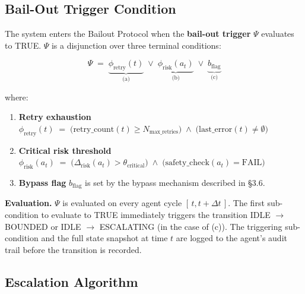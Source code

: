 \subsection{Bail-Out Trigger Condition}

The system enters the Bailout Protocol when the \textbf{bail-out trigger}
$\Psi$ evaluates to TRUE.  $\Psi$ is a disjunction over three terminal conditions:

\begin{equation}
\Psi \;=\; \underbrace{\phi_\text{retry}(t)}_{\text{(a)}} \;\lor\;
         \underbrace{\phi_\text{risk}(a_t)}_{\text{(b)}} \;\lor\;
         \underbrace{b_\text{flag}}_{\text{(c)}}
\end{equation}

\bigskip

\noindent where:

\begin{enumerate}
  \itemsep0pt
  \item \textbf{Retry exhaustion} $\phi_\text{retry}(t) \;=\;
    \bigl(\text{retry\_count}(t) \geq N_\text{max\_retries}\bigr) \;\land\;
    \bigl(\text{last\_error}(t) \neq \emptyset\bigr)$

  \item \textbf{Critical risk threshold} $\phi_\text{risk}(a_t) \;=\;
    \bigl(\Delta_\text{risk}(a_t) > \theta_\text{critical}\bigr) \;\land\;
    \bigl(\text{safety\_check}(a_t) = \text{FAIL}\bigr)$

  \item \textbf{Bypass flag} $b_\text{flag}$ is set by the bypass mechanism
    described in \S3.6.
\end{enumerate}

\bigskip

\noindent\textbf{Evaluation.}  $\Psi$ is evaluated on every agent cycle
$[\,t, t + \Delta t\,]$.  The first sub-condition to evaluate to TRUE
immediately triggers the transition IDLE $\rightarrow$ BOUNDED or
IDLE $\rightarrow$ ESCALATING (in the case of (c)).  The triggering sub-condition
and the full state snapshot at time $t$ are logged to the agent's audit trail
before the transition is recorded.

\subsection{Escalation Algorithm}

